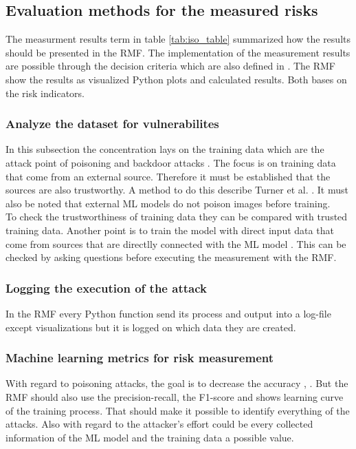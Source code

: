 \subsection{Evaluation methods for the measured risks}

The measurment results term in table \ref{tab:iso_table} summarized how the results should be presented in the RMF. The implementation of the measurement results are possible through the decision criteria which are also defined in \cite{ISO_27004_2009}. The RMF show the results as visualized Python plots and calculated results. Both bases on the risk indicators.

\subsubsection*{Analyze the dataset for vulnerabilites}

In this subsection the concentration lays on the training data which are the attack point of poisoning and backdoor attacks \cite{DBLP:conf/eusipco/ArshadAQLY21}. The focus is on training data that come from an external source. Therefore it must be established that the sources are also trustworthy. A method to do this describe Turner et al. \cite{turner2018clean}. It must also be noted that external ML models do not poison images before training. \\
To check the trustworthiness of training data they can be compared with trusted training data. Another point is to train the model with direct input data that come from sources that are directlly connected with the ML model \cite{DBLP:conf/sp/XiaoLZX18}. This can be checked by asking questions before executing the measurement with the RMF.

\subsubsection*{Logging the execution of the attack}

In the RMF every Python function send its process and output into a log-file except visualizations but it is logged on which data they are created.

\subsubsection*{Machine learning metrics for risk measurement}

With regard to poisoning attacks, the goal is to decrease the accuracy \cite{DBLP:conf/icml/BiggioNL12}, \cite{DBLP:journals/corr/abs-1708-06733}. But the RMF should also use the precision-recall, the F1-score and shows learning curve of the training process. That should make it possible to identify everything of the attacks. Also with regard to the attacker's effort could be every collected information of the ML model and the training data a possible value.

